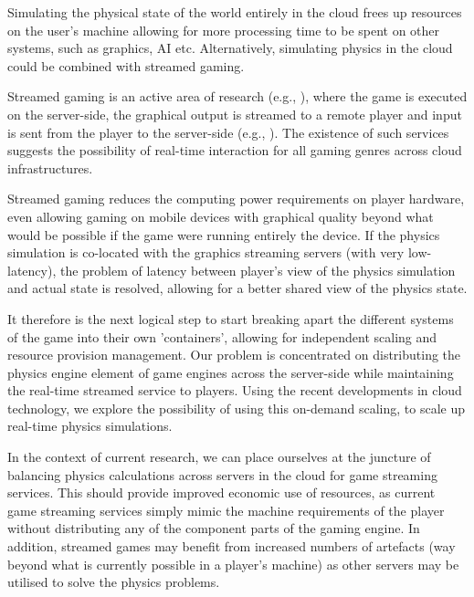 Simulating the physical state of the world entirely in the cloud frees up resources on the user's machine allowing for more processing time to be spent on other systems, such as graphics, AI etc. Alternatively, simulating physics in the cloud could be combined with streamed gaming.

Streamed gaming is an active area of research (e.g., \cite{GARCIAVALLS}), where the game is executed on the server-side, the graphical output is streamed to a remote player and input is sent from the player to the server-side (e.g., \cite{PSNOW, NVidiaGameStream}). The existence of such services suggests the possibility of real-time interaction for all gaming genres across cloud infrastructures. 

Streamed gaming reduces the computing power requirements on player hardware, even allowing gaming on mobile devices with graphical quality beyond what would be possible if the game were running entirely the device. If the physics simulation is co-located with the graphics streaming servers (with very low-latency), the problem of latency between player's view of the physics simulation and actual state is resolved, allowing for a better shared view of the physics state.

It therefore is the next logical step to start breaking apart the different systems of the game into their own 'containers', allowing for independent scaling and resource provision management. Our problem is concentrated on distributing the physics engine element of game engines across the server-side while maintaining the real-time streamed service to players.
Using the recent developments in cloud technology, we explore the possibility of using this on-demand scaling, to scale up real-time physics simulations.

In the context of current research, we can place ourselves at the juncture of balancing physics calculations across servers in the cloud for game streaming services. This should provide improved economic use of resources, as current game streaming services simply mimic the machine requirements of the player without distributing any of the component parts of the gaming engine. In addition, streamed games may benefit from increased numbers of artefacts (way beyond what is currently possible in a player's machine) as other servers may be utilised to solve the physics problems.


